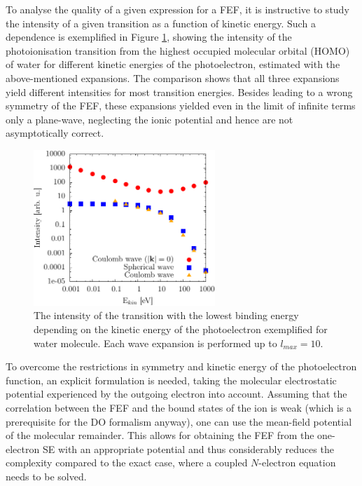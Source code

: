 To analyse the quality of a given expression for a FEF, it is instructive to study the intensity of a given transition as a function of kinetic energy.
Such a dependence is exemplified in Figure \ref{fig:Ekin}, showing the intensity of the photoionisation transition from the highest occupied molecular orbital (HOMO) of water for different kinetic energies of the photoelectron, estimated with the above-mentioned expansions.
The comparison shows that all three expansions yield different intensities for most transition energies.
Besides leading to a wrong symmetry of the FEF, these expansions yielded even in the limit of infinite terms only a plane-wave, neglecting the ionic potential and hence are not asymptotically correct.

\begin{figure}
   \includegraphics[width=0.61\textwidth]{Figures/water1}
   \caption{The intensity of the transition with the lowest binding energy depending on the kinetic energy of the photoelectron exemplified for water molecule. Each wave expansion is performed up to $l_{max}=10$.} 
   \label{fig:Ekin}
\end{figure}
To overcome the restrictions in symmetry and kinetic energy of the photoelectron function, an explicit formulation is needed, taking the molecular electrostatic potential experienced by the outgoing electron into account.
Assuming that the correlation between the FEF and the bound states of the ion is weak (which is a prerequisite for the DO formalism anyway), one can use the mean-field potential of the molecular remainder.
This allows for obtaining the FEF from the one-electron SE with an appropriate potential and thus considerably reduces the complexity compared to the exact case, where a coupled $N$-electron equation needs to be solved.

